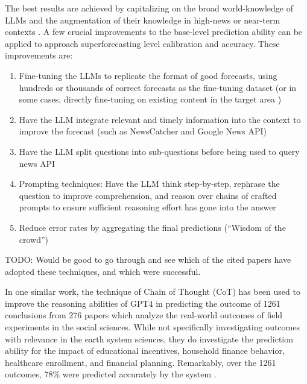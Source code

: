 \documentclass[12pt,a4paper]{article}
\begin{document}
The best results are achieved by capitalizing on the broad world-knowledge of LLMs and the augmentation of their knowledge in high-news or near-term contexts . A few crucial improvements to the base-level prediction ability can be applied to approach superforecasting level calibration and accuracy. These improvements are: 
\begin{enumerate}
\item Fine-tuning the LLMs to replicate the format of good forecasts, using hundreds or thousands of correct forecasts as the fine-tuning dataset (or in some cases, directly fine-tuning on existing content in the target area )
\item Have the LLM integrate relevant and timely information into the context to improve the forecast (such as NewsCatcher and Google News API)
\item Have the LLM split questions into sub-questions before being used to query news API
\item Prompting techniques: Have the LLM think step-by-step, rephrase the question to improve comprehension, and reason over chains of crafted prompts to ensure sufficient reasoning effort has gone into the answer
\item Reduce error rates by aggregating the final predictions (``Wisdom of the crowd'')
\end{enumerate}

TODO: Would be good to go through and see which of the cited papers have adopted these techniques, and which were successful.


In one similar work, the technique of Chain of Thought (CoT) has been used to improve the reasoning abilities of GPT4 in predicting the outcome of 1261 conclusions from 276 papers which analyze the real-world outcomes of field experiments in the social sciences. While not specifically investigating outcomes with relevance in the earth system sciences, they do investigate the prediction ability for the impact of educational incentives, household finance behavior, healthcare enrollment, and financial planning. Remarkably, over the 1261 outcomes, 78\% were predicted accurately by the system .

\end{document}
